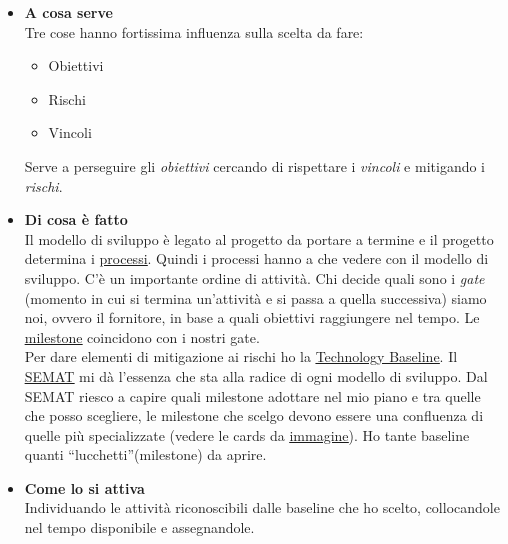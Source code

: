 		\begin{itemize}
			\item \textbf{A cosa serve}\\
			Tre cose hanno fortissima influenza sulla scelta da fare:
			\begin{itemize}
				\item Obiettivi
				\item Rischi
				\item Vincoli
			\end{itemize}
			Serve a perseguire gli \textit{obiettivi} cercando di rispettare i \textit{vincoli} e mitigando i \textit{rischi}.
			\item \textbf{Di cosa è fatto}\\
			Il modello di sviluppo è legato al progetto da portare a termine e il progetto determina i \underline{\hyperref[processo]{processi}}. Quindi i processi hanno a che vedere con il modello di sviluppo. C'è un importante ordine di attività. Chi decide quali sono i \textit{gate} (momento in cui si termina un'attività e si passa a quella successiva) siamo noi, ovvero il fornitore, in base a quali obiettivi raggiungere nel tempo. Le \underline{\hyperref[milestone]{milestone}} coincidono con i nostri gate. \\
			Per dare elementi di mitigazione ai rischi ho la \underline{\hyperref[technologybaseline]{Technology Baseline}}.
			Il \underline{\hyperref[semat]{SEMAT}} mi dà l'essenza che sta alla radice di ogni modello di sviluppo. Dal SEMAT riesco a capire quali milestone adottare nel mio piano e tra quelle che posso scegliere, le milestone che scelgo devono essere una confluenza di quelle più specializzate (vedere le cards da \underline{\hyperref[cardsemat]{immagine}}). Ho tante baseline quanti ``lucchetti''(milestone) da aprire.
			\item \textbf{Come lo si attiva}\\
			Individuando le attività riconoscibili dalle baseline che ho scelto, collocandole nel tempo disponibile e assegnandole.
		\end{itemize}

